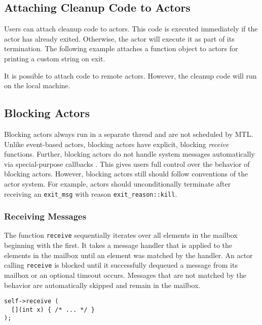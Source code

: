 
\subsection{Attaching Cleanup Code to Actors}
\label{attach}

Users can attach cleanup code to actors. This code is executed immediately if
the actor has already exited. Otherwise, the actor will execute it as part of
its termination. The following example attaches a function object to actors for
printing a custom string on exit.


It is possible to attach code to remote actors. However, the cleanup code will
run on the local machine.

\subsection{Blocking Actors}
\label{blocking-actor}

Blocking actors always run in a separate thread and are not scheduled by MTL.
Unlike event-based actors, blocking actors have explicit, blocking
\emph{receive} functions. Further, blocking actors do not handle system
messages automatically via special-purpose callbacks .
This gives users full control over the behavior of blocking actors. However,
blocking actors still should follow conventions of the actor system. For
example, actors should unconditionally terminate after receiving an
\lstinline^exit_msg^ with reason \lstinline^exit_reason::kill^.

\subsubsection{Receiving Messages}

The function \lstinline^receive^ sequentially iterates over all elements in the
mailbox beginning with the first. It takes a message handler that is applied to
the elements in the mailbox until an element was matched by the handler. An
actor calling \lstinline^receive^ is blocked until it successfully dequeued a
message from its mailbox or an optional timeout occurs. Messages that are not
matched by the behavior are automatically skipped and remain in the mailbox.

\begin{lstlisting}
self->receive (
  [](int x) { /* ... */ }
);
\end{lstlisting}

